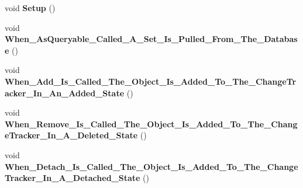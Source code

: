 \begin{DoxyCompactItemize}
\item 
\hypertarget{class_framework_extension_1_1_entity_framework_1_1_tests_1_1_integration_tests_1_1_given___a___e_f___context_a50d5c6c99069c4ab842faa674d1c8ab3}{void {\bfseries Setup} ()}\label{class_framework_extension_1_1_entity_framework_1_1_tests_1_1_integration_tests_1_1_given___a___e_f___context_a50d5c6c99069c4ab842faa674d1c8ab3}

\item 
\hypertarget{class_framework_extension_1_1_entity_framework_1_1_tests_1_1_integration_tests_1_1_given___a___e_f___context_ad22683b340548579f36e2000defa3598}{void {\bfseries When\-\_\-\-As\-Queryable\-\_\-\-Called\-\_\-\-A\-\_\-\-Set\-\_\-\-Is\-\_\-\-Pulled\-\_\-\-From\-\_\-\-The\-\_\-\-Database} ()}\label{class_framework_extension_1_1_entity_framework_1_1_tests_1_1_integration_tests_1_1_given___a___e_f___context_ad22683b340548579f36e2000defa3598}

\item 
\hypertarget{class_framework_extension_1_1_entity_framework_1_1_tests_1_1_integration_tests_1_1_given___a___e_f___context_ab7514aa42cb41b3d9d9de15be0541134}{void {\bfseries When\-\_\-\-Add\-\_\-\-Is\-\_\-\-Called\-\_\-\-The\-\_\-\-Object\-\_\-\-Is\-\_\-\-Added\-\_\-\-To\-\_\-\-The\-\_\-\-Change\-Tracker\-\_\-\-In\-\_\-\-An\-\_\-\-Added\-\_\-\-State} ()}\label{class_framework_extension_1_1_entity_framework_1_1_tests_1_1_integration_tests_1_1_given___a___e_f___context_ab7514aa42cb41b3d9d9de15be0541134}

\item 
\hypertarget{class_framework_extension_1_1_entity_framework_1_1_tests_1_1_integration_tests_1_1_given___a___e_f___context_a296f426aaaca7ec67f09292bba69bab7}{void {\bfseries When\-\_\-\-Remove\-\_\-\-Is\-\_\-\-Called\-\_\-\-The\-\_\-\-Object\-\_\-\-Is\-\_\-\-Added\-\_\-\-To\-\_\-\-The\-\_\-\-Change\-Tracker\-\_\-\-In\-\_\-\-A\-\_\-\-Deleted\-\_\-\-State} ()}\label{class_framework_extension_1_1_entity_framework_1_1_tests_1_1_integration_tests_1_1_given___a___e_f___context_a296f426aaaca7ec67f09292bba69bab7}

\item 
\hypertarget{class_framework_extension_1_1_entity_framework_1_1_tests_1_1_integration_tests_1_1_given___a___e_f___context_a2fe0d758e38ff2b76fdadf317318d1a0}{void {\bfseries When\-\_\-\-Detach\-\_\-\-Is\-\_\-\-Called\-\_\-\-The\-\_\-\-Object\-\_\-\-Is\-\_\-\-Added\-\_\-\-To\-\_\-\-The\-\_\-\-Change\-Tracker\-\_\-\-In\-\_\-\-A\-\_\-\-Detached\-\_\-\-State} ()}\label{class_framework_extension_1_1_entity_framework_1_1_tests_1_1_integration_tests_1_1_given___a___e_f___context_a2fe0d758e38ff2b76fdadf317318d1a0}

\end{DoxyCompactItemize}
